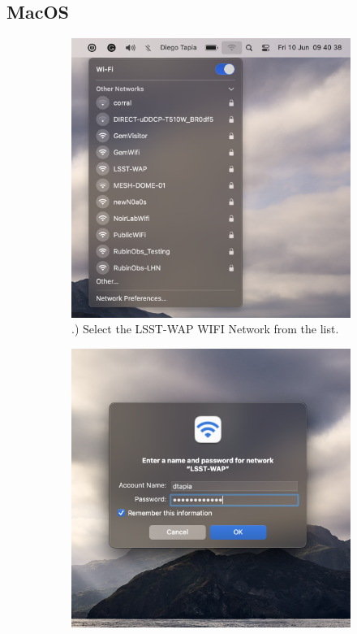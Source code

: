 \newpage
  
  \subsection{MacOS}
  \vspace{20 mm}
  \begin{figure}
    \centering
    \begin{subfigure}{0.40\textwidth}
      \includegraphics[width=\textwidth]{Images/Mac1.png}
      .) Select the LSST-WAP WIFI Network from the list.
    \end{subfigure}
      \hfill
    \begin{subfigure}{0.40\textwidth}
      \includegraphics[width=\textwidth]{Images/Mac3.png}

\end{subfigure}
\end{figure}
